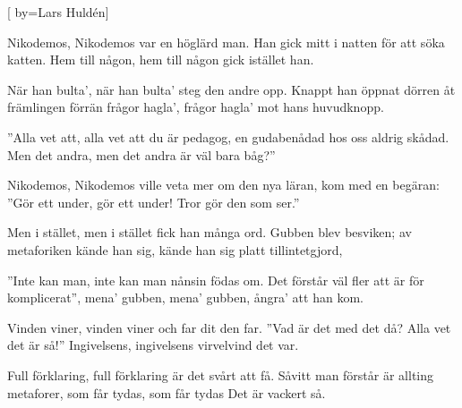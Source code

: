 

[
	by={Lars Huldén}] 



\beginverse*
Nikodemos, Nikodemos
var en höglärd man.
Han gick mitt i natten
för att söka katten.
Hem till någon, hem till någon
gick istället han.
\endverse

\beginverse*
När han bulta', när han bulta' 
steg den andre opp.
Knappt han öppnat dörren
åt främlingen förrän
frågor hagla', frågor hagla' 
mot hans huvudknopp.
\endverse

\beginverse*
''Alla vet att, alla vet att
du är pedagog,
en gudabenådad
hos oss aldrig skådad.
Men det andra, men det andra
är väl bara båg?''
\endverse

\beginverse*
Nikodemos, Nikodemos
ville veta mer
om den nya läran,
kom med en begäran:
''Gör ett under, gör ett under!
Tror gör den som ser.''
\endverse

\beginverse*
Men i stället, men i stället
fick han många ord.
Gubben blev besviken;
av metaforiken
kände han sig, kände han sig
platt tillintetgjord,
\endverse

\beginverse*
''Inte kan man, inte kan man
nånsin födas om.
Det förstår väl fler att
är för komplicerat'',
mena' gubben, mena' gubben,
ångra' att han kom.
\endverse

\beginverse*
Vinden viner, vinden viner
och far dit den far.
''Vad är det med det då?
Alla vet det är så!''
Ingivelsens, ingivelsens
virvelvind det var.
\endverse

\beginverse*
Full förklaring, full förklaring
är det svårt att få.
Såvitt man förstår är
allting metaforer,
som får tydas, som får tydas
Det är vackert så.
\endverse


\endsong
